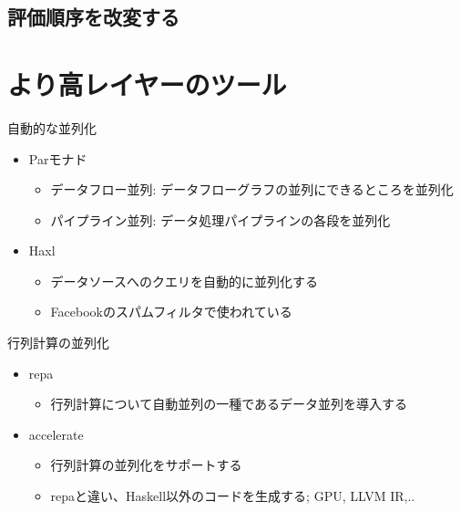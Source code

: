 \documentclass[unicode,12pt]{beamer}
\begin{document}
\subsection{評価順序を改変する}

\begin{frame}{}

\end{frame}

\section{より高レイヤーのツール}

\begin{frame}{自動的な並列化}
  \begin{itemize}
  \item Parモナド
    \begin{itemize}
    \item データフロー並列: データフローグラフの並列にできるところを並列化
    \item パイプライン並列: データ処理パイプラインの各段を並列化
    \end{itemize}
  \item Haxl
    \begin{itemize}
    \item データソースへのクエリを自動的に並列化する
    \item Facebookのスパムフィルタで使われている
    \end{itemize}
  \end{itemize}
\end{frame}

\begin{frame}{行列計算の並列化}
  \begin{itemize}
  \item repa
    \begin{itemize}
      \item 行列計算について自動並列の一種であるデータ並列を導入する
    \end{itemize}
  \item accelerate
    \begin{itemize}
      \item 行列計算の並列化をサポートする
      \item repaと違い、Haskell以外のコードを生成する; GPU, LLVM IR,..
      \end{itemize}
  \end{itemize}
\end{frame}
\end{document}
